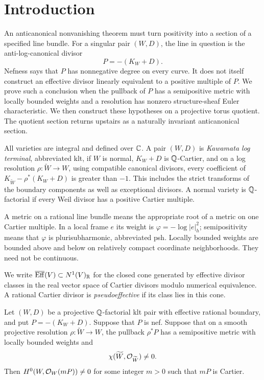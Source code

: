 \section{Introduction}\label{sec:introduction}

An anticanonical nonvanishing theorem must turn positivity into a section of a specified line bundle. For a singular pair $(W,D)$, the line in question is the anti-log-canonical divisor
\[
P=-(K_W+D).
\]
Nefness says that $P$ has nonnegative degree on every curve. It does not itself construct an effective divisor linearly equivalent to a positive multiple of $P$. We prove such a conclusion when the pullback of $P$ has a semipositive metric with locally bounded weights and a resolution has nonzero structure-sheaf Euler characteristic. We then construct these hypotheses on a projective torus quotient. The quotient section returns upstairs as a naturally invariant anticanonical section.

All varieties are integral and defined over $\mathbb C$. A pair $(W,D)$ is \emph{Kawamata log terminal}, abbreviated klt, if $W$ is normal, $K_W+D$ is $\mathbb Q$-Cartier, and on a log resolution $\rho:\widetilde W\to W$, using compatible canonical divisors, every coefficient of $K_{\widetilde W}-\rho^*(K_W+D)$ is greater than $-1$. This includes the strict transforms of the boundary components as well as exceptional divisors. A normal variety is $\mathbb Q$-factorial if every Weil divisor has a positive Cartier multiple.

A metric on a rational line bundle means the appropriate root of a metric on one Cartier multiple. In a local frame $e$ its weight is $\varphi=-\log |e|_h^2$; semipositivity means that $\varphi$ is plurisubharmonic, abbreviated psh. Locally bounded weights are bounded above and below on relatively compact coordinate neighborhoods. They need not be continuous.

We write $\overline{\operatorname{Eff}}(V)\subset N^1(V)_{\mathbb R}$ for the closed cone generated by effective divisor classes in the real vector space of Cartier divisors modulo numerical equivalence. A rational Cartier divisor is \emph{pseudoeffective} if its class lies in this cone.

\begin{theorem}\label{thm:klt}
Let $(W,D)$ be a projective $\mathbb Q$-factorial klt pair with effective rational boundary, and put $P=-(K_W+D)$. Suppose that $P$ is nef. Suppose that on a smooth projective resolution $\rho:\widetilde W\to W$, the pullback $\rho^*P$ has a semipositive metric with locally bounded weights and
\[
\chi(\widetilde W,\mathcal O_{\widetilde W})\ne0.
\]
Then $H^0(W,\mathcal O_W(mP))\ne0$ for some integer $m>0$ such that $mP$ is Cartier.
\end{theorem}

